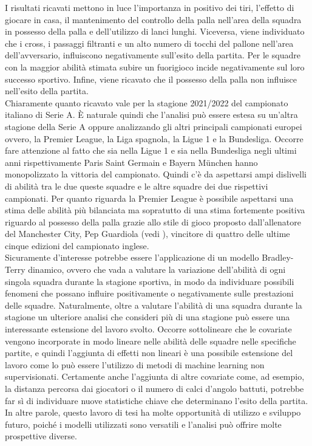 I risultati ricavati mettono in luce l'importanza in positivo dei tiri, l'effetto di giocare in casa, il mantenimento del controllo della palla nell'area della squadra in possesso della palla e dell'utilizzo di lanci lunghi. Viceversa, viene individuato che i cross, i passaggi filtranti e un alto numero di tocchi del pallone nell'area dell’avversario, influiscono negativamente sull'esito della partita. Per le squadre con la maggior abilità stimata subire un fuorigioco incide negativamente sul loro successo sportivo. Infine, viene ricavato che il possesso della palla non influisce nell'esito della partita.\\
Chiaramente quanto ricavato vale per la stagione 2021/2022 del campionato italiano di Serie A. È naturale quindi che l'analisi può essere estesa su un’altra stagione della Serie A oppure analizzando gli altri principali campionati europei ovvero, la Premier League, la Liga spagnola, la Ligue 1 e la Bundesliga. Occorre fare attenzione al fatto che sia nella Ligue 1 e sia nella Bundesliga negli ultimi anni rispettivamente Paris Saint Germain e Bayern München hanno monopolizzato la vittoria del campionato. Quindi c'è da aspettarsi ampi dislivelli di abilità tra le due queste squadre e le altre squadre dei due rispettivi campionati. Per quanto riguarda la Premier League è possibile aspettarsi una stima delle abilità più bilanciata ma sopratutto di una stima fortemente positiva riguardo al possesso della palla grazie allo stile di gioco proposto dall'allenatore del Manchester City, Pep Guardiola (vedi \textit{\cite{futbol}}), vincitore di quattro delle ultime cinque edizioni del campionato inglese.\\
Sicuramente d'interesse potrebbe essere l'applicazione di un modello Bradley-Terry dinamico, ovvero che vada a valutare la variazione dell'abilità di ogni singola squadra durante la stagione sportiva, in modo da individuare possibili fenomeni che possano influire positivamente o negativamente sulle prestazioni delle squadre. Naturalmente, oltre a valutare l'abilità di una squadra durante la stagione un ulteriore analisi che consideri più di una stagione può essere una interessante estensione del lavoro svolto. Occorre sottolineare che le covariate vengono incorporate in modo lineare nelle abilità delle squadre nelle specifiche partite, e quindi l'aggiunta di effetti non lineari è una possibile estensione del lavoro come lo può essere l'utilizzo di metodi di machine learning non supervisionati. Certamente anche l'aggiunta di altre covariate come, ad esempio, la distanza percorsa dai giocatori o il numero di calci d'angolo battuti, potrebbe far sì di individuare nuove statistiche chiave che determinano l'esito della partita.\\
In altre parole, questo lavoro di tesi ha molte opportunità di utilizzo e sviluppo futuro, poiché i modelli utilizzati sono versatili e l'analisi può offrire molte prospettive diverse.
